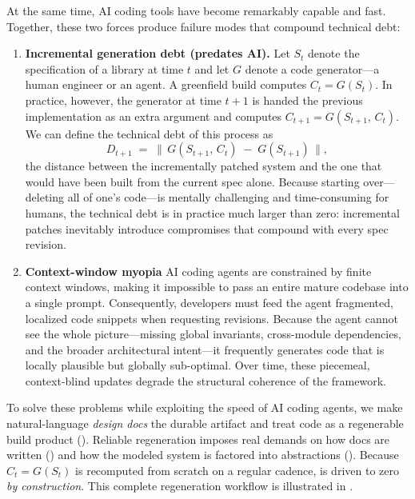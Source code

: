 \documentclass{article}
\begin{document}
At the same time, AI coding tools have become remarkably capable and fast.
Together, these two forces produce failure modes that compound technical debt:

\begin{enumerate}
\item \textbf{Incremental generation debt (predates AI).} Let $S_t$ denote the
specification of a library at time $t$ and let $G$ denote a code generator---a
human engineer or an agent. A greenfield build computes $C_t = G(S_t)$. In
practice, however, the generator at time $t{+}1$ is handed the previous
implementation as an extra argument and computes
$C_{t+1} = G\!\left(S_{t+1},\, C_t\right)$. We can define the technical debt of
this process as
\begin{equation}
D_{t+1} \;=\; \bigl\lVert\, G(S_{t+1},\, C_t) \;-\; G(S_{t+1}) \,\bigr\rVert,
\label{eq:debt}
\end{equation}
the distance between the incrementally patched system and the one that would
have been built from the current spec alone. Because starting over---deleting
all of one's code---is mentally challenging and time-consuming for humans,
the technical debt is in practice much larger than zero: incremental patches inevitably introduce compromises that compound with every spec revision.
\item \textbf{Context-window myopia} AI coding agents are constrained by finite context windows, making it impossible to pass an entire mature codebase into a single prompt. Consequently, developers must feed the agent fragmented, localized code snippets when requesting revisions. Because the agent cannot see the whole picture—missing global invariants, cross-module dependencies, and the broader architectural intent—it frequently generates code that is locally plausible but globally sub-optimal. Over time, these piecemeal, context-blind updates degrade the structural coherence of the framework.
\end{enumerate}

To solve these problems while exploiting the speed of AI coding agents, we
make natural-language \emph{design docs} the durable artifact and treat code
as a regenerable build product (). Reliable regeneration
imposes real demands on how docs are written () and how the
modeled system is factored into abstractions (). Because $C_t = G(S_t)$ is recomputed from scratch
on a regular cadence,  is driven to zero \emph{by
construction}. This complete regeneration workflow is illustrated in .
\end{document}
